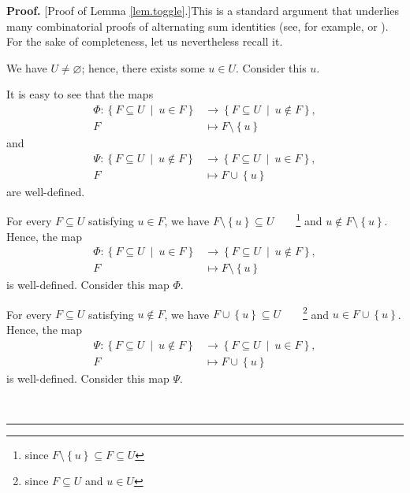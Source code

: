 \documentclass[numbers=enddot,12pt,final,onecolumn]{scrartcl}%
\theoremstyle{definition}
\newenvironment{proof}[1][Proof]{\noindent\textbf{#1.} }{\ \rule{0.5em}{0.5em}}
\newenvironment{verlong}{}{}
\newenvironment{vershort}{}{}
\begin{document}
\begin{proof}
[Proof of Lemma \ref{lem.toggle}.]This is a standard argument that underlies
many combinatorial proofs of alternating sum identities (see, for example,
\cite[proof of (2.4)]{Sagan20} or \cite[proof of (1)]{BenQui08}). For the sake
of completeness, let us nevertheless recall it.

We have $U\neq\varnothing$; hence, there exists some $u\in U$. Consider this
$u$.

\begin{vershort}
It is easy to see that the maps%
\begin{align*}
\Phi:\left\{  F\subseteq U\ \mid\ u\in F\right\}   &  \rightarrow\left\{
F\subseteq U\ \mid\ u\notin F\right\}  ,\\
F  &  \mapsto F\setminus\left\{  u\right\}
\end{align*}
and%
\begin{align*}
\Psi:\left\{  F\subseteq U\ \mid\ u\notin F\right\}   &  \rightarrow\left\{
F\subseteq U\ \mid\ u\in F\right\}  ,\\
F  &  \mapsto F\cup\left\{  u\right\}
\end{align*}
are well-defined.
\end{vershort}

\begin{verlong}
For every $F\subseteq U$ satisfying $u\in F$, we have $F\setminus\left\{
u\right\}  \subseteq U$\ \ \ \ \footnote{since $F\setminus\left\{  u\right\}
\subseteq F\subseteq U$} and $u\notin F\setminus\left\{  u\right\}  $. Hence,
the map%
\begin{align*}
\Phi:\left\{  F\subseteq U\ \mid\ u\in F\right\}   &  \rightarrow\left\{
F\subseteq U\ \mid\ u\notin F\right\}  ,\\
F  &  \mapsto F\setminus\left\{  u\right\}
\end{align*}
is well-defined. Consider this map $\Phi$.

For every $F\subseteq U$ satisfying $u\notin F$, we have $F\cup\left\{
u\right\}  \subseteq U$\ \ \ \ \footnote{since $F\subseteq U$ and $u\in U$}
and $u\in F\cup\left\{  u\right\}  $. Hence, the map%
\begin{align*}
\Psi:\left\{  F\subseteq U\ \mid\ u\notin F\right\}   &  \rightarrow\left\{
F\subseteq U\ \mid\ u\in F\right\}  ,\\
F  &  \mapsto F\cup\left\{  u\right\}
\end{align*}
is well-defined. Consider this map $\Psi$.
\end{verlong}


\end{proof}
\end{document}
